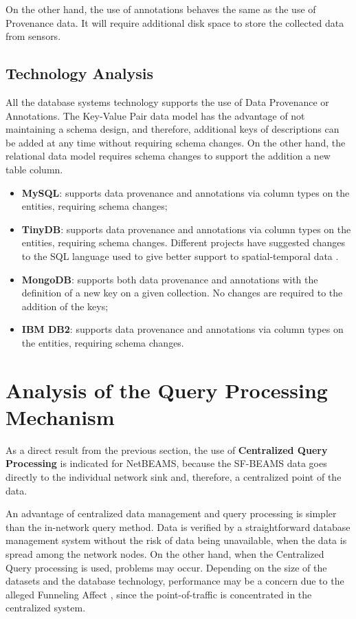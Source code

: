 On the other hand, the use of annotations behaves the same as the use of
Provenance data. It will require additional disk space to store the
collected data from sensors.

\subsection{Technology Analysis}

All the database systems technology supports the use of Data Provenance or
Annotations. The Key-Value Pair data model has the advantage of not maintaining
a schema design, and therefore, additional keys of descriptions can be added at
any time without requiring schema changes. On the other hand, the relational
data model requires schema changes to support the addition a new table column.

\begin{itemize}
  \item \textbf{MySQL}: supports data provenance and annotations via column
  types on the entities, requiring schema changes;
  \item \textbf{TinyDB}: supports data provenance and annotations via column
  types on the entities, requiring schema changes. Different projects have
  suggested changes to the SQL language used to give better support to
  spatial-temporal data \cite{sn-db-newop}.
  \item \textbf{MongoDB}: supports both data provenance and annotations with
  the definition of a new key on a given collection. No changes are required to
  the addition of the keys;
  \item \textbf{IBM DB2}: supports data provenance and annotations via column
  types on the entities, requiring schema changes.
\end{itemize}

\section{Analysis of the Query Processing Mechanism}

As a direct result from the previous section, the use of \textbf{Centralized Query
Processing} is indicated for NetBEAMS, because the SF-BEAMS data goes directly
to the individual network sink and, therefore, a centralized point of the data.

An advantage of centralized data management and query processing is simpler
than the in-network query method. Data is verified by a straightforward
database management system without the risk of data being unavailable, when
the data is spread among the network nodes. On the other hand, when the
Centralized Query processing is used, problems may occur. Depending on the
size of the datasets and the database technology, performance may be a concern
due to the alleged Funneling Affect \cite{sn-storage04}, since the
point-of-traffic is concentrated in the centralized system.

